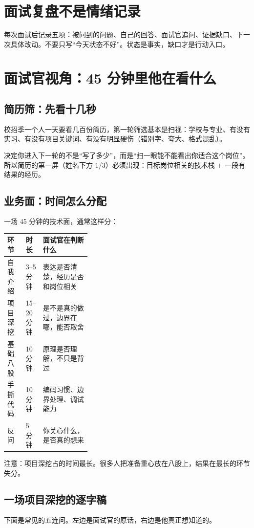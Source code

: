 \documentclass[UTF8,zihao=5,openany]{ctexbook}
\begin{document}
\section{面试复盘不是情绪记录}
每次面试后记录五项：被问到的问题、自己的回答、面试官追问、证据缺口、下一次具体改动。不要只写“今天状态不好”。状态是事实，缺口才是行动入口。

\section{面试官视角：45 分钟里他在看什么}
\subsection{简历筛：先看十几秒}
校招季一个人一天要看几百份简历，第一轮筛选基本是扫视：学校与专业、有没有实习、有没有项目关键词、有没有明显硬伤（错别字、夸大、格式混乱）。

决定你进入下一轮的不是“写了多少”，而是“扫一眼能不能看出你适合这个岗位”。所以简历的第一屏（姓名下方 1/3）必须出现：目标岗位相关的技术栈 + 一段有结果的经历。

\subsection{业务面：时间怎么分配}
一场 45 分钟的技术面，通常这样分：

\begin{center}\small
\begin{tabularx}{\linewidth}{p{0.22\linewidth}p{0.12\linewidth}Y}
\toprule
环节 & 时长 & 面试官在判断什么 \\
\midrule
自我介绍 & 3--5 分钟 & 表达是否清楚，经历是否和岗位相关 \\
项目深挖 & 15--20 分钟 & 是不是真的做过，边界在哪，能否取舍 \\
基础八股 & 10 分钟 & 原理是否理解，不只是背过 \\
手撕代码 & 10 分钟 & 编码习惯、边界处理、调试能力 \\
反问 & 5 分钟 & 你关心什么，是否真的想来 \\
\bottomrule
\end{tabularx}
\end{center}

注意：项目深挖占的时间最长。很多人把准备重心放在八股上，结果在最长的环节失分。

\subsection{一场项目深挖的逐字稿}
下面是常见的五连问。左边是面试官的原话，右边是他真正想知道的。
\end{document}
